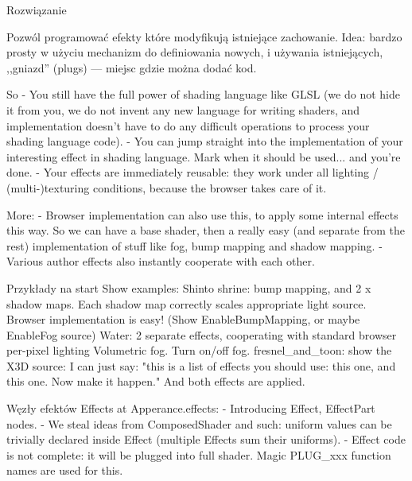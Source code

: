 \documentclass{beamer}
\begin{document}
\begin{frame}{Rozwiązanie}

Pozwól programować efekty które modyfikują istniejące zachowanie.
Idea: bardzo prosty w użyciu mechanizm do definiowania nowych,
i używania istniejących, ,,gniazd'' (plugs) --- miejsc gdzie można
dodać kod.

  So
  - You still have the full power of shading language like GLSL
    (we do not hide it from you, we do not invent any new language
    for writing shaders, and implementation doesn't have to do any
    difficult operations to process your shading language code).
  - You can jump straight into the implementation of your
    interesting effect in shading language.
    Mark when it should be used... and you're done.
  - Your effects are immediately reusable: they work under all
    lighting / (multi-)texturing conditions, because the browser
    takes care of it.

  More:
  - Browser implementation can also use this,
    to apply some internal effects this way. So we can have a base
    shader, then a really easy (and separate from the rest)
    implementation of stuff like fog, bump mapping and shadow mapping.
  - Various author effects also instantly cooperate with each other.
\end{frame}

\begin{frame}{Przykłady na start}
  Show examples:
    Shinto shrine: bump mapping, and 2 x shadow maps.
      Each shadow map correctly scales appropriate light source.
      Browser implementation is easy!
      (Show EnableBumpMapping, or maybe EnableFog source)
    Water: 2 separate effects, cooperating with standard browser per-pixel lighting
    Volumetric fog. Turn on/off fog.
    fresnel\_and\_toon: show the X3D source:
      I can just say: "this is a list of effects you should use:
      this one, and this one. Now make it happen."
      And both effects are applied.
\end{frame}

\begin{frame}{Węzły efektów}
  Effects at Apperance.effects:
  - Introducing Effect, EffectPart nodes.
  - We steal ideas from ComposedShader and such: uniform values
    can be trivially declared inside Effect (multiple Effects sum their
    uniforms).
  - Effect code is not complete: it will be plugged into full shader.
    Magic PLUG\_xxx function names are used for this.
\end{frame}
\end{document}
